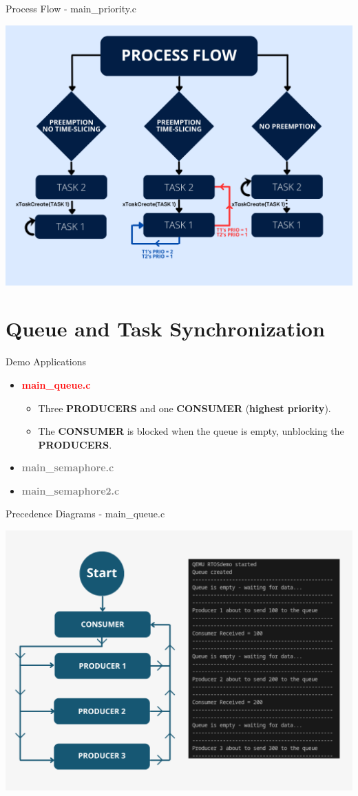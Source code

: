 \documentclass{beamer}
\begin{document}
\begin{frame}{Process Flow - main\_priority.c}

\vfill
\centering
\includegraphics[width=0.65\linewidth]{img/dynamic_priority.png} 
\vfill
    
\end{frame}

\section{Queue and Task Synchronization}
\begin{frame}{Demo Applications}
        \begin{itemize}
        \item \textcolor{red}{\textbf{main\_queue.c}}
        \begin{itemize}
            \item Three \textbf{PRODUCERS} and one \textbf{CONSUMER} (\textbf{highest priority}).
            \item The \textbf{CONSUMER} is blocked when the queue is empty, unblocking the \textbf{PRODUCERS}.
        \end{itemize}
        \item \textcolor{gray}{\textbf{main\_semaphore.c}}
        \item \textcolor{gray}{\textbf{main\_semaphore2.c}}
    \end{itemize}
\end{frame}

\begin{frame}{Precedence Diagrams - main\_queue.c}

\vfill
\centering
\includegraphics[width=0.7\linewidth]{img/main_queue.png} 
\vfill
    
\end{frame}
\end{document}
